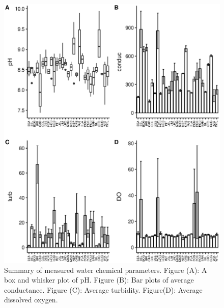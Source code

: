   \begin{figure}[!hp]
  \centering
    \includegraphics[width=\textwidth]{figures/watboxplotlake.eps}
    \caption{Summary of measured water chemical parameters. Figure (A): A box and whisker plot of pH. Figure (B): Bar plots of average conductance. Figure (C): Average turbidity. Figure(D): Average dissolved oxygen. }
  \end{figure}
